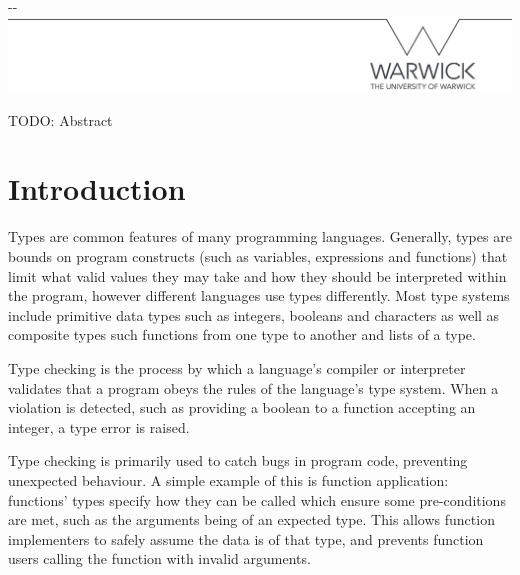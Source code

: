 \documentclass[a4paper,fleqn,12pt]{article}
\begin{document}
\makeatletter
\begin{titlepage}

\LARGE \@title \\
\Large \\[1.5cm]

\vfill 

\begin{adjustwidth}{-\oddsidemargin-1in}{-\rightmargin}
  \centering
  \includegraphics[width=\paperwidth]{line.png}
\end{adjustwidth}

\vspace*{-3.5cm}

\end{titlepage}
\makeatother

\pagestyle{plain}




TODO: Abstract
\section{Introduction}\label{id:h.6k9gcmunzldy}
Types are common features of many programming languages. Generally, types are bounds on program constructs (such as variables, expressions and functions) that limit what valid values they may take and how they should be interpreted within the program, however different languages use types differently. Most type systems include primitive data types such as integers, booleans and characters as well as composite types such functions from one type to another and lists of a type.

Type checking is the process by which a language’s compiler or interpreter validates that a program obeys the rules of the language’s type system. When a violation is detected, such as providing a boolean to a function accepting an integer, a type error is raised.

Type checking is primarily used to catch bugs in program code, preventing unexpected behaviour. A simple example of this is function application: functions’ types specify how they can be called which ensure some pre-conditions are met, such as the arguments being of an expected type. This allows function implementers to safely assume the data is of that type, and prevents function users calling the function with invalid arguments.
\end{document}
